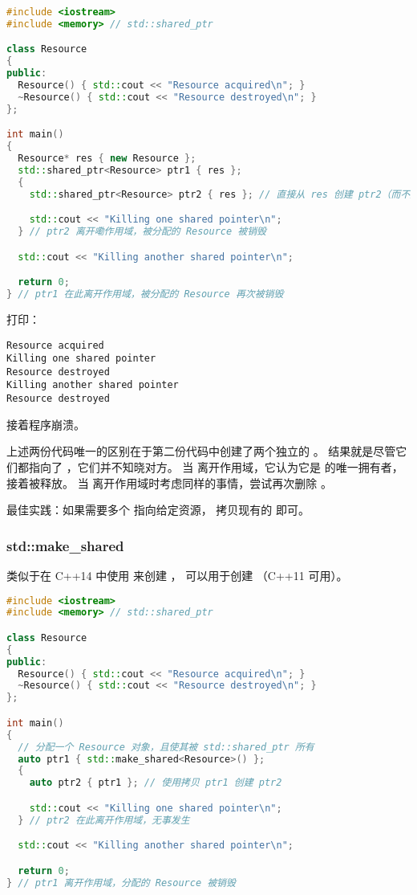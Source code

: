 \documentclass[../../LearnCpp.tex]{subfiles}
\begin{document}
\begin{lstlisting}[language=C++]
#include <iostream>
#include <memory> // std::shared_ptr

class Resource
{
public:
  Resource() { std::cout << "Resource acquired\n"; }
  ~Resource() { std::cout << "Resource destroyed\n"; }
};

int main()
{
  Resource* res { new Resource };
  std::shared_ptr<Resource> ptr1 { res };
  {
    std::shared_ptr<Resource> ptr2 { res }; // 直接从 res 创建 ptr2（而不是从 ptr1）

    std::cout << "Killing one shared pointer\n";
  } // ptr2 离开嘞作用域，被分配的 Resource 被销毁

  std::cout << "Killing another shared pointer\n";

  return 0;
} // ptr1 在此离开作用域，被分配的 Resource 再次被销毁
\end{lstlisting}

打印：

\begin{lstlisting}
Resource acquired
Killing one shared pointer
Resource destroyed
Killing another shared pointer
Resource destroyed
\end{lstlisting}

接着程序崩溃。

上述两份代码唯一的区别在于第二份代码中创建了两个独立的 。
结果就是尽管它们都指向了 ，它们并不知晓对方。
当  离开作用域，它认为它是  的唯一拥有者，接着被释放。
当  离开作用域时考虑同样的事情，尝试再次删除 。

最佳实践：如果需要多个  指向给定资源，
拷贝现有的  即可。

\subsubsection*{std::make\_shared}

类似于在 C++14 中使用  来创建 ，
 可以用于创建 （C++11 可用）。

\begin{lstlisting}[language=C++]
#include <iostream>
#include <memory> // std::shared_ptr

class Resource
{
public:
  Resource() { std::cout << "Resource acquired\n"; }
  ~Resource() { std::cout << "Resource destroyed\n"; }
};

int main()
{
  // 分配一个 Resource 对象，且使其被 std::shared_ptr 所有
  auto ptr1 { std::make_shared<Resource>() };
  {
    auto ptr2 { ptr1 }; // 使用拷贝 ptr1 创建 ptr2

    std::cout << "Killing one shared pointer\n";
  } // ptr2 在此离开作用域，无事发生

  std::cout << "Killing another shared pointer\n";

  return 0;
} // ptr1 离开作用域，分配的 Resource 被销毁
\end{lstlisting}
\end{document}
